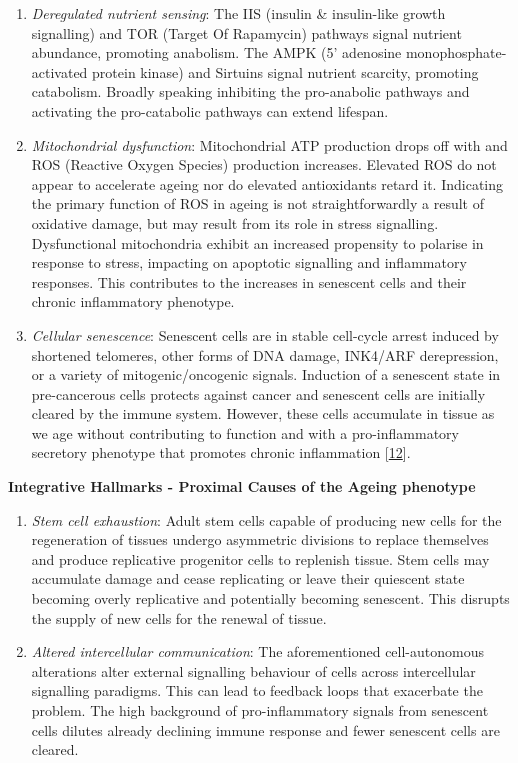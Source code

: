 \documentclass[
]{book}
\begin{document}
\begin{enumerate}
\def\labelenumi{\arabic{enumi}.}
\setcounter{enumi}{4}
\item
  \emph{Deregulated nutrient sensing}:
  The IIS (insulin \& insulin-like growth signalling) and TOR (Target Of Rapamycin) pathways signal nutrient abundance, promoting anabolism.
  The AMPK (5' adenosine monophosphate-activated protein kinase) and Sirtuins signal nutrient scarcity, promoting catabolism.
  Broadly speaking inhibiting the pro-anabolic pathways and activating the pro-catabolic pathways can extend lifespan.
\item
  \emph{Mitochondrial dysfunction}:
  Mitochondrial ATP production drops off with and ROS (Reactive Oxygen Species) production increases. Elevated ROS do not appear to accelerate ageing nor do elevated antioxidants retard it.
  Indicating the primary function of ROS in ageing is not straightforwardly a result of oxidative damage, but may result from its role in stress signalling.
  Dysfunctional mitochondria exhibit an increased propensity to polarise in response to stress, impacting on apoptotic signalling and inflammatory responses.
  This contributes to the increases in senescent cells and their chronic inflammatory phenotype.
\item
  \emph{Cellular senescence}:
  Senescent cells are in stable cell-cycle arrest induced by shortened telomeres, other forms of DNA damage, INK4/ARF derepression, or a variety of mitogenic/oncogenic signals.
  Induction of a senescent state in pre-cancerous cells protects against cancer and senescent cells are initially cleared by the immune system.
  However, these cells accumulate in tissue as we age without contributing to function and with a pro-inflammatory secretory phenotype that promotes chronic inflammation {[}\protect\hyperlink{ref-Avelar2020}{12}{]}.
\end{enumerate}

\textbf{Integrative Hallmarks - Proximal Causes of the Ageing phenotype}

\begin{enumerate}
\def\labelenumi{\arabic{enumi}.}
\setcounter{enumi}{7}
\item
  \emph{Stem cell exhaustion}:
  Adult stem cells capable of producing new cells for the regeneration of tissues undergo asymmetric divisions to replace themselves and produce replicative progenitor cells to replenish tissue.
  Stem cells may accumulate damage and cease replicating or leave their quiescent state becoming overly replicative and potentially becoming senescent.
  This disrupts the supply of new cells for the renewal of tissue.
\item
  \emph{Altered intercellular communication}:
  The aforementioned cell-autonomous alterations alter external signalling behaviour of cells across intercellular signalling paradigms.
  This can lead to feedback loops that exacerbate the problem. The high background of pro-inflammatory signals from senescent cells dilutes already declining immune response and fewer senescent cells are cleared.
\end{enumerate}
\end{document}
